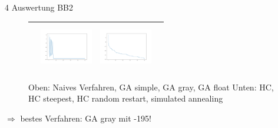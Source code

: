 \documentclass{ocbeameruni}
\begin{document}
\begin{frame}{4 Auswertung BB2}
\begin{center}
\begin{figure}
\begin{tabular}{|c|c|c|c|}
    & \includegraphics[width=23mm, height=20mm]{plots/bb2_hc_rs.png}
    & \includegraphics[width=23mm, height=20mm]{plots/bb2_sa.png} \\ \hline
    \end{tabular}
    \caption{Oben: Naives Verfahren, GA simple, GA gray, GA float \hspace{\textwidth}Unten: HC, HC steepest, HC random restart, simulated annealing}
    \end{figure}
    $\Rightarrow$ bestes Verfahren: GA gray mit -195!
    \end{center}
\end{frame}
\end{document}
